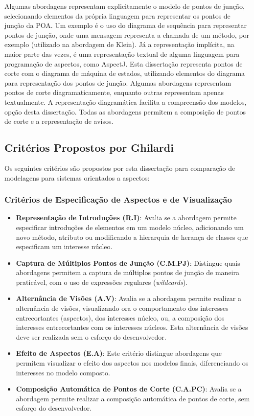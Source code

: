 Algumas abordagens representam explicitamente o modelo de pontos de junção, selecionando elementos da própria linguagem para representar os pontos de
junção da POA. Um exemplo é o uso do diagrama de sequência para representar pontos de junção, onde uma mensagem representa a chamada de um método, por
exemplo (utilizado na abordagem de Klein). Já a representação implícita, na maior parte das vezes, é uma representação textual de alguma linguagem
para programação de aspectos, como AspectJ. Esta dissertação representa pontos de corte com o diagrama de máquina de estados, utilizando elementos do diagrama 
para representação dos pontos de junção. Algumas abordagens representam pontos de corte diagramaticamente, enquanto outras representam apenas
textualmente. A representação diagramática facilita a compreensão dos modelos, opção desta dissertação. Todas as abordagens permitem a composição de
pontos de corte e a representação de avisos.

\subsection{Critérios Propostos por Ghilardi}\label{sec:ghilardi}

Os seguintes critérios são propostos por esta dissertação para comparação de modelagens para sistemas orientados a aspectos:

\subsubsection{Critérios de Especificação de Aspectos e de Visualização}

\begin{itemize}
	\item \textbf{Representação de Introduções (R.I)}: Avalia se a abordagem permite especificar introduções de elementos em um modelo núcleo,
	adicionando um novo método, atributo ou modificando a hierarquia de herança de classes que especificam um interesse núcleo.
	\item \textbf{Captura de Múltiplos Pontos de Junção (C.M.PJ)}: Distingue quais abordagens
	permitem a captura de múltiplos pontos de junção de maneira praticável, com o uso de expressões regulares (\textit{wildcards}).
	\item \textbf{Alternância de Visões (A.V)}: Avalia se a abordagem permite realizar a alternância de visões, visualizando ora o comportamento dos
	interesses entrecortantes (aspectos), dos interesses núcleo, ou, a composição dos interesses entrecortantes com os interesses núcleos. Esta alternância de visões deve 
	ser realizada sem o esforço do desenvolvedor.
	\item \textbf{Efeito de Aspectos (E.A)}: Este critério distingue abordagens que permitem visualizar o efeito dos aspectos nos modelos finais,
	diferenciando os interesses no modelo composto.
	\item \textbf{Composição Automática de Pontos de Corte (C.A.PC)}: Avalia se a abordagem permite realizar a composição automática de pontos de corte,
	sem esforço do desenvolvedor.
\end{itemize}

